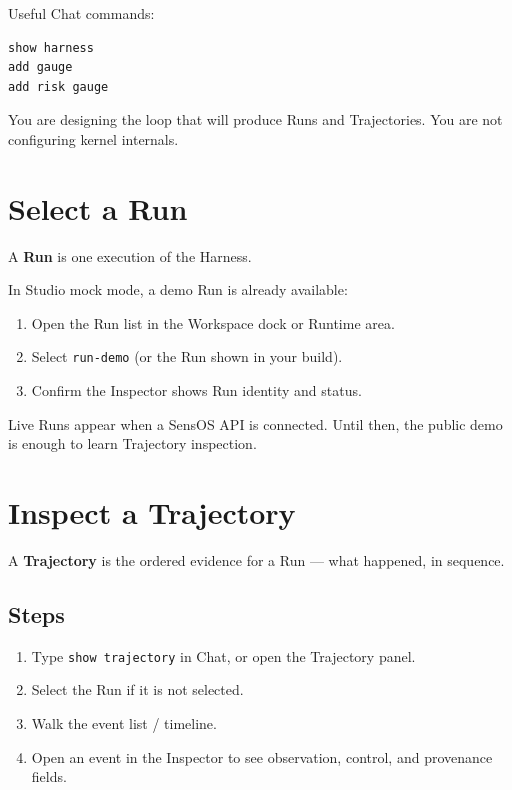 \documentclass[11pt,a4paper,oneside]{article}
\newcommand{\pathcode}[1]{\texttt{#1}}
\begin{document}
Useful Chat commands:

\begin{lstlisting}
show harness
add gauge
add risk gauge
\end{lstlisting}

You are designing the loop that will produce Runs and Trajectories. You are not configuring kernel internals.

\section{Select a Run}
\label{sec:run}

A \textbf{Run} is one execution of the Harness.

In Studio mock mode, a demo Run is already available:

\begin{enumerate}
  \item Open the Run list in the Workspace dock or Runtime area.
  \item Select \pathcode{run-demo} (or the Run shown in your build).
  \item Confirm the Inspector shows Run identity and status.
\end{enumerate}

Live Runs appear when a SensOS API is connected. Until then, the public demo is enough to learn Trajectory inspection.

\section{Inspect a Trajectory}
\label{sec:trajectory}

A \textbf{Trajectory} is the ordered evidence for a Run — what happened, in sequence.

\subsection{Steps}

\begin{enumerate}
  \item Type \pathcode{show trajectory} in Chat, or open the Trajectory panel.
  \item Select the Run if it is not selected.
  \item Walk the event list / timeline.
  \item Open an event in the Inspector to see observation, control, and provenance fields.
\end{enumerate}
\end{document}

